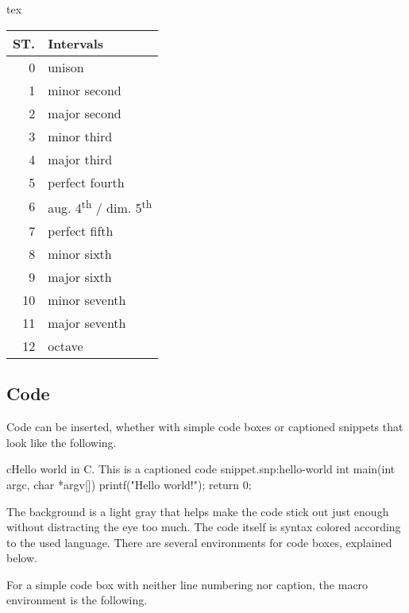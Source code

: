 \documentclass[
	raggedright,
	12pt,
	colorful,
]{tufte-style-article}
\begin{document}
\begin{codebox}{tex}
\begin{margintable}[]\small
	\caption{Major, minor and perfect music intervals. ST. stands for \textit{semitones}. This table is in the margin. \label{tab:table-margin}}
	\begin{tabular}{rl}
		\toprule
		\textbf{ST.} & \textbf{Intervals} \\
		\midrule
		0 & unison \\
		1 & minor second \\
		2 & major second \\
		3 & minor third \\
		4 & major third \\
		5 & perfect fourth \\
		6 & aug. 4\textsuperscript{th} / dim. 5\textsuperscript{th} \\
		7 & perfect fifth \\
		8 & minor sixth \\
		9 & major sixth \\
		10 & minor seventh \\
		11 & major seventh \\
		12 & octave \\
		\bottomrule
	\end{tabular}
\end{margintable}
\end{codebox}

\newpage

\subsection{Code}
\label{sub:code}

Code can be inserted, whether with simple code boxes or captioned snippets that look like the following.
\begin{snippet}{c}{Hello world in C. This is a captioned code snippet.}{snp:hello-world}
int main(int argc, char *argv[]) {
	printf("Hello world!");
	return 0;
}
\end{snippet}

The background is a light gray that helps make the code stick out just enough without distracting the eye too much. The code itself is syntax colored according to the used language. There are several environments for code boxes, explained below.

For a simple code box with neither line numbering nor caption, the macro environment is the following.
\end{document}
